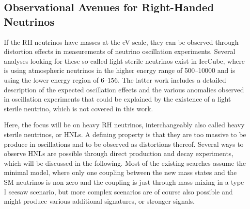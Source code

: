 
\subsection{Observational Avenues for Right-Handed Neutrinos}

If the RH neutrinos have masses at the \si{\electronvolt} scale, they can be observed through distortion effects in measurements of neutrino oscillation experiments. Several analyses looking for these so-called light sterile neutrinos exist in IceCube, where  is using atmospheric neutrinos in the higher energy range of \SIrange{500}{10000}{\gev} and  is using the lower energy region of \SIrange{6}{156}{\gev}. The latter work includes a detailed description of the expected oscillation effects and the various anomalies observed in oscillation experiments that could be explained by the existence of a light sterile neutrino, which is not covered in this work.

Here, the focus will be on heavy RH neutrinos, interchangeably also called heavy sterile neutrinos, or HNLs. A defining property is that they are too massive to be produce in oscillations and to be observed as distortions thereof. Several ways to observe HNLs are possible through direct production and decay experiments, which will be discussed in the following. Most of the existing searches assume the minimal model, where only one coupling between the new mass states and the SM neutrinos is non-zero and the coupling is just through mass mixing in a type I seesaw scenario, but more complex scenarios are of course also possible and might produce various additional signatures, or stronger signals.

